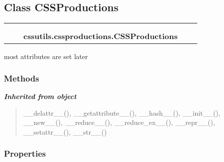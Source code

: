 
\subsection{Class CSSProductions}

    \label{cssutils:cssproductions:CSSProductions}
\begin{tabular}{cccccc}
\multicolumn{2}{r}{\settowidth{\BCL}{object}\multirow{2}{\BCL}{object}}
&&
  \\\cline{3-3}
  &&\multicolumn{1}{c|}{}
&&
  \\
&&\multicolumn{2}{l}{\textbf{cssutils.cssproductions.CSSProductions}}
\end{tabular}


most attributes are set later


  \subsubsection{Methods}


\large{\textbf{\textit{Inherited from object}}}

\begin{quote}
\_\_delattr\_\_(), \_\_getattribute\_\_(), \_\_hash\_\_(), \_\_init\_\_(), \_\_new\_\_(), \_\_reduce\_\_(), \_\_reduce\_ex\_\_(), \_\_repr\_\_(), \_\_setattr\_\_(), \_\_str\_\_()
\end{quote}


  \subsubsection{Properties}


